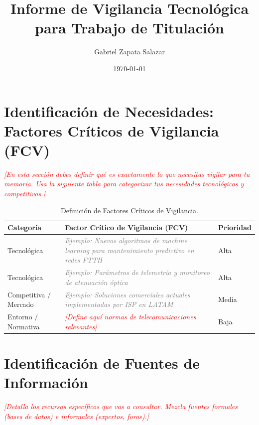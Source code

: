\documentclass[12pt,a4paper]{article}
\title{\textbf{Informe de Vigilancia Tecnológica para Trabajo de Titulación}}
\author{Gabriel Zapata Salazar}
\date{\today}
\newcommand{\instruccion}[1]{\textcolor{red}{\textit{[#1]}}}
\newcommand{\ejemplo}[1]{\textcolor{gray}{\textit{Ejemplo: #1}}}
\begin{document}
\maketitle

\section{Identificación de Necesidades: Factores Críticos de Vigilancia (FCV)}
\instruccion{En esta sección debes definir qué es exactamente lo que necesitas vigilar para tu memoria. Usa la siguiente tabla para categorizar tus necesidades tecnológicas y competitivas.}
\vspace{0.5cm}

\begin{table}[h]
\centering
\renewcommand{\arraystretch}{1.3}
\begin{tabularx}{\textwidth}{|l|X|l|}
\hline
\textbf{Categoría} & \textbf{Factor Crítico de Vigilancia (FCV)} & \textbf{Prioridad} \\ \hline
Tecnológica & \ejemplo{Nuevos algoritmos de machine learning para mantenimiento predictivo en redes FTTH} & Alta \\ \hline
Tecnológica & \ejemplo{Parámetros de telemetría y monitoreo de atenuación óptica} & Alta \\ \hline
Competitiva / Mercado & \ejemplo{Soluciones comerciales actuales implementadas por ISP en LATAM} & Media \\ \hline
Entorno / Normativa & \instruccion{Define aquí normas de telecomunicaciones relevantes} & Baja \\ \hline
\end{tabularx}
\caption{Definición de Factores Críticos de Vigilancia.}
\label{tab:fcv}
\end{table}

\section{Identificación de Fuentes de Información}
\instruccion{Detalla los recursos específicos que vas a consultar. Mezcla fuentes formales (bases de datos) e informales (expertos, foros).}

\vspace{0.5cm}
\end{document}
